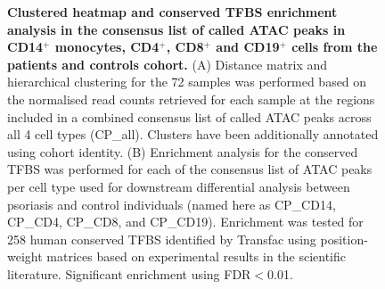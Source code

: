 \begin{figure}[H]
\begin{subfigure}[b]{0.7\textwidth}
\caption{}
\end{subfigure}
\caption[Clustered heatmap and conserved TFBS enrichment analysis in the consensus list of called ATAC peaks in CD14$^+$ monocytes, CD4$^+$, CD8$^+$ and CD19$^+$ cells from the patients and controls cohort.]{\textbf{Clustered heatmap and conserved TFBS enrichment analysis in the consensus list of called ATAC peaks in CD14$^+$ monocytes, CD4$^+$, CD8$^+$ and CD19$^+$ cells from the patients and controls cohort.} (A) Distance matrix and hierarchical clustering for the 72 samples was performed based on the normalised read counts retrieved for each sample at the regions included in a combined consensus list of called ATAC peaks across all 4 cell types (CP\_all). Clusters have been additionally annotated using cohort identity. (B) Enrichment analysis for the conserved TFBS was performed for each of the consensus list of ATAC peaks per cell type used for downstream differential analysis between psoriasis and control individuals (named here as CP\_CD14, CP\_CD4, CP\_CD8, and CP\_CD19). Enrichment was tested for 258 human conserved TFBS identified by Transfac using position-weight matrices based on experimental results in the scientific literature. Significant enrichment using FDR$<$0.01.}
\label{figure:ATAC_PS_CTL_heatmap_TFBS}
\end{figure}



